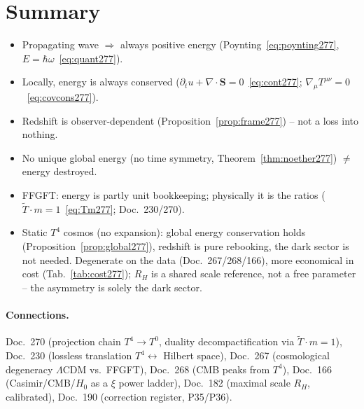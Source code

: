 \section{Summary}

\begin{itemize}
  \item Propagating wave $\Rightarrow$ always positive energy
        (Poynting~\eqref{eq:poynting277}, $E=\hbar\omega$~\eqref{eq:quant277}).
  \item Locally, energy is always conserved
        ($\partial_t u+\nabla\!\cdot\mathbf S=0$~\eqref{eq:cont277};
        $\nabla_\mu T^{\mu\nu}=0$~\eqref{eq:covcons277}).
  \item Redshift is observer-dependent (Proposition~\ref{prop:frame277}) --
        not a loss into nothing.
  \item No unique global energy (no time symmetry,
        Theorem~\ref{thm:noether277}) $\neq$ energy destroyed.
  \item FFGFT: energy is partly unit bookkeeping; physically it is the ratios
        ($\tilde T\cdot m = 1$~\eqref{eq:Tm277}; Doc.~230/270).
  \item Static $T^4$ cosmos (no expansion): global energy conservation holds
        (Proposition~\ref{prop:global277}), redshift is pure rebooking, the dark
        sector is not needed. Degenerate on the data (Doc.~267/268/166), more
        economical in cost (Tab.~\ref{tab:cost277}); $R_H$ is a shared scale
        reference, not a free parameter -- the asymmetry is solely the dark
        sector.
\end{itemize}

\paragraph{Connections.}
Doc.~270 (projection chain $T^4\to T^0$, duality decompactification via
$\tilde T\cdot m=1$), Doc.~230 (lossless translation $T^4\leftrightarrow$
Hilbert space), Doc.~267 (cosmological degeneracy $\Lambda$CDM vs.\ FFGFT),
Doc.~268 (CMB peaks from $T^4$), Doc.~166 (Casimir/CMB/$H_0$ as a $\xi$ power
ladder), Doc.~182 (maximal scale $R_H$, calibrated), Doc.~190 (correction
register, P35/P36).

